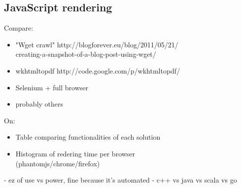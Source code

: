 \subsection{JavaScript rendering}
Compare:
\begin{itemize}
  \item "Wget crawl" http://blogforever.eu/blog/2011/05/21/\\creating-a-snapshot-of-a-blog-post-using-wget/
  \item wkhtmltopdf http://code.google.com/p/wkhtmltopdf/
  \item Selenium + full browser
  \item probably others
\end{itemize}
On:
\begin{itemize}
  \item Table comparing functionalities of each solution
  \item Histogram of redering time per browser\\(phantomjs/chrome/firefox)
\end{itemize}

- ez of use vs power, fine because it's automated
- c++ vs java vs scala vs go \cite{hundt2011}
